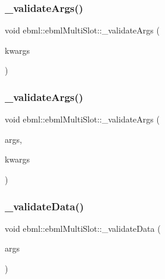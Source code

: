 \subsubsection{\texorpdfstring{\+\_\+validate\+Args()}{\_validateArgs()}\hspace{0.1cm}{\footnotesize\ttfamily [2/3]}}
{\footnotesize\ttfamily void ebml\+::ebml\+Multi\+Slot\+::\+\_\+validate\+Args (\begin{DoxyParamCaption}\item[{const \mbox{\hyperlink{namespaceebml_a4317d4c495715eced3ed448c2d05caeb}{slot\+Arg\+\_\+d}} \&}]{kwargs }\end{DoxyParamCaption})\hspace{0.3cm}{\ttfamily [protected]}}

\mbox{\label{classebml_1_1ebmlMultiSlot_ae405c0712f66903b2f05b74132eb1317}} 
\subsubsection{\texorpdfstring{\+\_\+validate\+Args()}{\_validateArgs()}\hspace{0.1cm}{\footnotesize\ttfamily [3/3]}}
{\footnotesize\ttfamily void ebml\+::ebml\+Multi\+Slot\+::\+\_\+validate\+Args (\begin{DoxyParamCaption}\item[{const \mbox{\hyperlink{namespaceebml_ae432575dfbb3e141ce897442794f0ca5}{slot\+Arg\+\_\+l}} \&}]{args,  }\item[{const \mbox{\hyperlink{namespaceebml_a4317d4c495715eced3ed448c2d05caeb}{slot\+Arg\+\_\+d}} \&}]{kwargs }\end{DoxyParamCaption})\hspace{0.3cm}{\ttfamily [protected]}}

\mbox{\label{classebml_1_1ebmlMultiSlot_a55c35fb4ca640b362e395515088140eb}} 
\subsubsection{\texorpdfstring{\+\_\+validate\+Data()}{\_validateData()}\hspace{0.1cm}{\footnotesize\ttfamily [1/2]}}
{\footnotesize\ttfamily void ebml\+::ebml\+Multi\+Slot\+::\+\_\+validate\+Data (\begin{DoxyParamCaption}\item[{const \mbox{\hyperlink{namespaceebml_ae432575dfbb3e141ce897442794f0ca5}{slot\+Arg\+\_\+l}} \&}]{args }\end{DoxyParamCaption})\hspace{0.3cm}{\ttfamily [protected]}}

